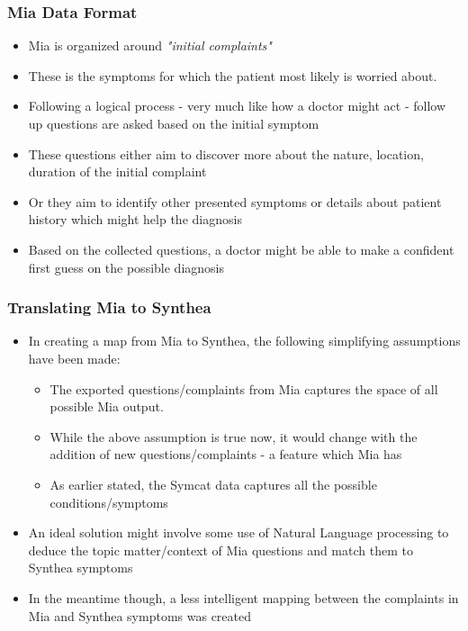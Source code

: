 \documentclass{beamer}
\begin{document}
\frametitle{Mia Data Format }
\begin{frame}
\begin{itemize}
	\item Mia is organized around \textit{"initial complaints"}
	\item These is the symptoms for which the patient most likely is worried about.
	\item Following a logical process - very much like how a doctor might act - follow up questions are asked based on the initial symptom
	\item These questions either aim to discover more about the nature, location, duration of the initial complaint
	\item Or they aim to identify other presented symptoms or details about patient history which might help the diagnosis
	\item Based on the collected questions, a doctor might be able to make a confident first guess on the possible diagnosis
\end{itemize}
\end{frame}

\frametitle{Translating Mia to Synthea }
\begin{frame}
\begin{itemize}
	\item In creating a map from Mia to Synthea, the following simplifying assumptions have been made:
	\begin{itemize}
		\item The exported questions/complaints from Mia captures the space of all possible Mia output.
		\item While the above assumption is true now, it would change with the addition of new questions/complaints - a feature which Mia has
		\item As earlier stated, the Symcat data captures all the possible conditions/symptoms
	\end{itemize}
	\item An ideal solution might involve some use of Natural Language processing to deduce the topic matter/context of Mia questions and match them to Synthea symptoms
	\item In the meantime though, a less intelligent mapping between the complaints in Mia and Synthea symptoms was created
\end{itemize}
\end{frame}
\end{document}
